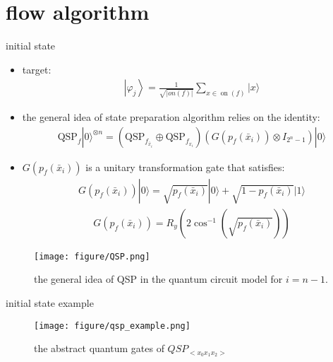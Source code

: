 \section{flow algorithm}
\begin{frame}{initial state }
    \begin{itemize}
      \item target:
      \begin{align}
        \left|\varphi_{j}\right\rangle= \frac{1}{\sqrt{|on(f)|}} \sum_{x \in \operatorname{on}(f)}|x\rangle
      \end{align}
      \item the  general  idea  of  state  preparation  algorithm  relies on the identity:
      \begin{align}
        \mathrm{QSP}_{f}|0\rangle^{\otimes n} = \left(\mathrm{QSP}_{f_{\bar{x}_{i}}} \oplus \mathrm{QSP}_{f_{x_{i}}}\right)\left(G\left(p_{f}\left(\bar{x}_{i}\right)\right) \otimes I_{2^{n}-1}\right)|0\rangle
      \end{align}
      \item $G\left(p_{f}\left(\bar{x}_{i}\right)\right)$ is a unitary transformation gate that satisfies:
      \begin{align}
        G(p_{f}\left(\bar{x}_{i}\right))|0\rangle = \sqrt{p_{f}\left(\bar{x}_{i}\right)}|0\rangle+\sqrt{1-p_{f}\left(\bar{x}_{i}\right)}|1\rangle
      \end{align}
      \begin{align}
        G\left(p_{f}\left(\bar{x}_{i}\right)\right) = R_{y}\left(2 \cos ^{-1}\left(\sqrt{p_{f}\left(\bar{x}_{i}\right)}\right)\right)
      \end{align}
    \end{itemize}
  \end{frame}
  \begin{frame}
    \begin{figure}[htbq]
      \centering
      \texttt{[image: figure/QSP.png]}
      \caption{the general idea of QSP in the quantum  circuit  model for $i=n-1$.} 
      \label{fig-qsp}
    \end{figure}
  \end{frame}
  \begin{frame}{initial state example}
    \begin{figure}[htbq]
      \centering
      \texttt{[image: figure/qsp\_example.png]}
      \caption{the abstract quantum gates of $QSP_{<x_0x_1x_2>}$} 
      \label{fig-qsp-example}
    \end{figure}
  \end{frame}
